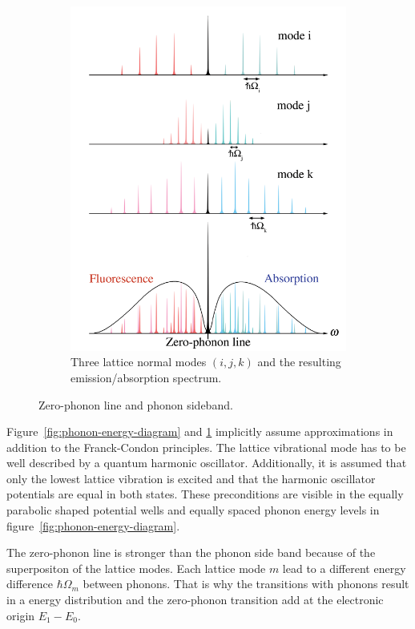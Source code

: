 \begin{figure}[H]
\begin{subfigure}[b]{0.48\textwidth}
		\includegraphics[width=\textwidth]{figures/quantum-dot/Lattice-modes}
		\caption{Three lattice normal modes $(i, j, k)$ and the resulting emission/absorption spectrum.~\cite{noauthor_zero-phonon_nodate}\\}
		\label{fig:lattice-modes}
	\end{subfigure}
	\caption{Zero-phonon line and phonon sideband.}
	\label{fig:zero-phonon-line-phonon-side-band}
\end{figure}
Figure~\ref{fig:phonon-energy-diagram} and \ref{fig:lattice-modes} implicitly assume approximations in addition to the Franck-Condon principles.
The lattice vibrational mode has to be well described by a quantum harmonic oscillator.
Additionally, it is assumed that only the lowest lattice vibration is excited and that the harmonic oscillator potentials are equal in both states.
These preconditions are visible in the equally parabolic shaped potential wells and equally spaced phonon energy levels in figure~\ref{fig:phonon-energy-diagram}.

The zero-phonon line is stronger than the phonon side band because of the superpositon of the lattice modes. Each lattice mode $m$ lead to a different energy difference $\hbar \Omega_m$ between phonons.
That is why the transitions with phonons result in a energy distribution and the zero-phonon transition add at the electronic origin $E_1 - E_0$.

